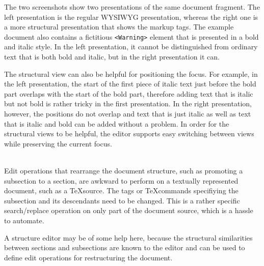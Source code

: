
The two screenshots show two presentations of the same document fragment. The left presentation is the regular WYSIWYG presentation, whereas the right one is a more structural presentation that shows the markup tags. The example document also contains a fictitious \verb|<Warning>| element that is presented in a bold and italic style. In the left presentation, it cannot be distinguished from ordinary text that is both bold and italic, but in the right presentation it can.

The structural view can also be helpful for positioning the focus. For example, in the left presentation, the start of the first piece of italic text just before the bold part overlaps with the start of the bold part, therefore adding text that is italic but not bold is rather tricky in the first presentation. In the right presentation, however, the positions do not overlap and text that is just italic as well as text that is italic and bold can be added without a problem. In order for the structural views to be helpful, the editor supports easy switching between views while preserving the current focus.


\\

Edit operations that rearrange the document structure, such as promoting a subsection to a section, are awkward to perform on a textually represented document, such as a \TeX source. The tags or \TeX commands specifiying the subsection and its descendants need to be changed. This is a rather specific search/replace operation on only part of the document source, which is a hassle to automate.

A structure editor may be of some help here, because the structural similarities between sections and subsections are known to the editor and can be used to define edit operations for restructuring the document.

